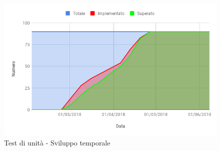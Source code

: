 			\begin{figure}[H]{\textwidth}
  				\centering
  				\includegraphics[width=1\linewidth]{./img/Test/sviluppoUnita.png}
	  			\caption{Test di unità - Sviluppo temporale}
			\end{figure}
